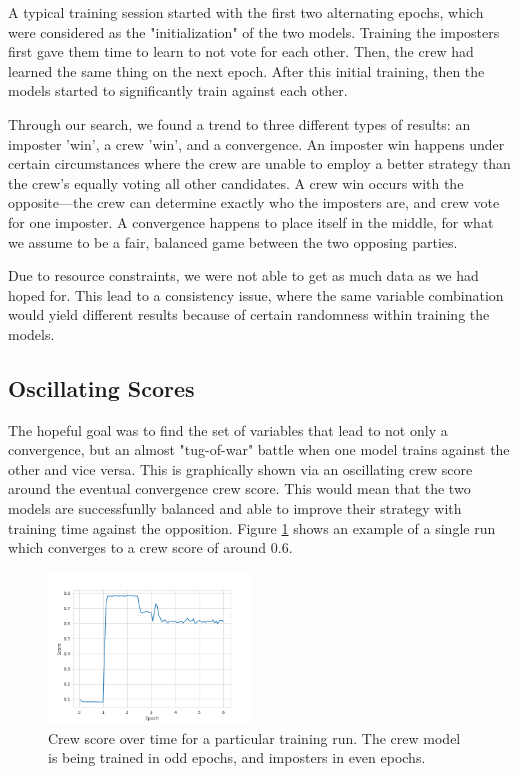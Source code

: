 \documentclass[10pt,twocolumn,letterpaper]{article}
\begin{document}
A typical training session started with the first two alternating epochs,
which were considered as the "initialization" of the two models. Training the imposters
first gave them time to learn to not vote for each other. Then, the crew
had learned the same thing on the next epoch. After this initial training,
then the models started to significantly train against each other.

Through our search, we found a trend to three different types of results:
an imposter 'win', a crew 'win', and a convergence.
An imposter win happens under certain circumstances where the crew are unable
to employ a better strategy than the crew's equally voting all other candidates.
A crew win occurs with the opposite---the crew can determine exactly who the imposters
are, and crew vote for one imposter. A convergence happens to place itself in the middle,
for what we assume to be a fair, balanced game between the two opposing parties.

Due to resource constraints, we were not able to get as much 
data as we had hoped for.
This lead to a consistency issue, where the same variable combination would yield
different results because of certain randomness within training the models.

\subsection{Oscillating Scores}
The hopeful goal was to find the set of variables that lead to not only a convergence,
but an almost "tug-of-war" battle when one model trains against the other and vice versa.
This is graphically shown via an oscillating crew score around the 
eventual convergence crew score. This would mean that the two models
are successfunlly balanced and able to improve their strategy with training time against
the opposition. Figure \ref{fig:osc} shows an example of a single run which converges
to a crew score of around 0.6.
\begin{figure}[h]
   \begin{center}
      \includegraphics[width=0.47827\textwidth]{img/m16_r10.png}
   \end{center}
   
   \label{fig:osc}
   \caption{Crew score over time for a particular training run. The crew model is
   being trained in odd epochs, and imposters in even epochs.}
\end{figure}
\end{document}
